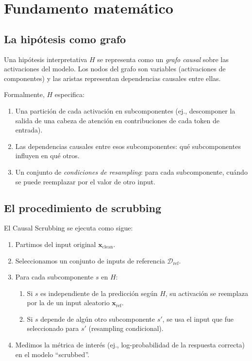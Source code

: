 \documentclass[11pt,a4paper]{report}
\theoremstyle{definition}
\begin{document}
\section{Fundamento matemático}

\subsection{La hipótesis como grafo}

Una hipótesis interpretativa $H$ se representa como un \emph{grafo causal} sobre las activaciones del modelo. Los nodos del grafo son variables (activaciones de componentes) y las aristas representan dependencias causales entre ellas.

Formalmente, $H$ especifica:

\begin{enumerate}
    \item Una partición de cada activación en subcomponentes (ej., descomponer la salida de una cabeza de atención en contribuciones de cada token de entrada).
    \item Las dependencias causales entre esos subcomponentes: qué subcomponentes influyen en qué otros.
    \item Un conjunto de \emph{condiciones de resampling}: para cada subcomponente, cuándo se puede reemplazar por el valor de otro input.
\end{enumerate}

\subsection{El procedimiento de scrubbing}

El Causal Scrubbing se ejecuta como sigue:

\begin{enumerate}
    \item Partimos del input original $\mathbf{x}_{\text{clean}}$.
    \item Seleccionamos un conjunto de inputs de referencia $\mathcal{D}_{\text{ref}}$.
    \item Para cada subcomponente $s$ en $H$:
    \begin{enumerate}
        \item Si $s$ es independiente de la predicción según $H$, su activación se reemplaza por la de un input aleatorio $\mathbf{x}_{\text{ref}}$.
        \item Si $s$ depende de algún otro subcomponente $s'$, se usa el input que fue seleccionado para $s'$ (resampling condicional).
    \end{enumerate}
    \item Medimos la métrica de interés (ej., log-probabilidad de la respuesta correcta) en el modelo ``scrubbed''.
\end{enumerate}
\end{document}
